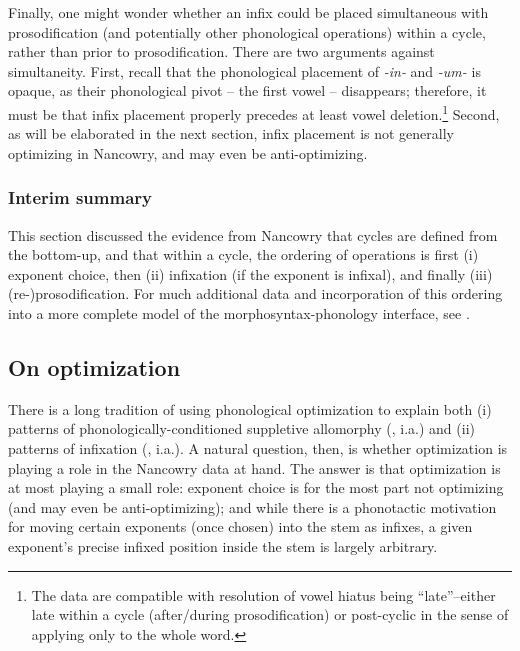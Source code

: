 \documentclass[output=paper]{langscibook}
\begin{document}
Finally, one might wonder whether an infix could be placed simultaneous with prosodification (and potentially other phonological operations) within a cycle, rather than prior to prosodification. There are two arguments against simultaneity. First, recall that the phonological placement of \textit{-in-} and \textit{-um-} is opaque, as their phonological pivot -- the first vowel -- disappears; therefore, it must be that infix placement properly precedes at least vowel deletion.\footnote{The data are compatible with resolution of vowel hiatus being ``late''--either late within a cycle (after/during prosodification) or post-cyclic in the sense of applying only to the whole word.} Second, as will be elaborated in the next section, infix placement is not generally optimizing in Nancowry, and may even be anti-optimizing.

\subsubsection{Interim summary}\label{sec:kalin:4.2.3}

This section discussed the evidence from Nancowry that cycles are defined from the bottom-up, and that within a cycle, the ordering of operations is first (i) exponent choice, then (ii) infixation (if the exponent is infixal), and finally (iii) (re-)prosodification. For much additional data and incorporation of this ordering into a more complete model of the morphosyntax-phonology interface, see \citealt{KalinIP}.

\subsection{On optimization}\label{kalinopt}\label{sec:kalin:4.3}

There is a long tradition of using phonological optimization to explain both (i) patterns of phonologically-conditioned suppletive allomorphy (\citealt{MP93a,Mester94,Kager96,Mascaro96,Mascaro07,Wolf08,Kim10}, i.a.) and (ii) patterns of infixation (\citealt{MP93a,HI97,Horwood02,Wolf08}, i.a.). A natural question, then, is whether optimization is playing a role in the Nancowry data at hand. The answer is that optimization is at most playing a small role: exponent choice is for the most part not optimizing (and may even be anti-optimizing); and while there is a phonotactic motivation for moving certain exponents (once chosen) into the stem as infixes, a given exponent's precise infixed position inside the stem is largely arbitrary.
\end{document}

